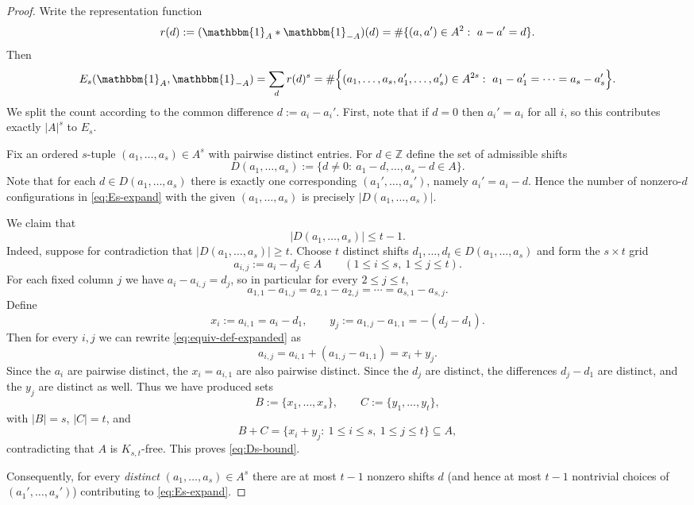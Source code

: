 \documentclass[A4paper,reqno,oneside,12pt]{amsart}
\theoremstyle{plain}
\theoremstyle{definition}
\newcommand{\e}{\mathbbm{1}}          %
\newcommand{\Z}{\mathbb{Z}}
\begin{document}
\begin{proof}
Write the representation function  
\[
r(d):=(\e_A*\e_{-A})(d)=\#\{(a,a')\in A^2:\ a-a'=d\}.
\]
Then
\begin{equation}\label{eq:Es-expand}
E_s(\e_A,\e_{-A})
=\sum_{d} r(d)^s
=\#\Bigl\{(a_1,\dots,a_s,a_1',\dots,a_s')\in A^{2s}:\ a_1-a_1'=\cdots=a_s-a_s'\Bigr\}.
\end{equation}
We split the count according to the common difference $d:=a_i-a_i'$. First, note that if $d=0$ then $a_i'=a_i$ for all $i$, so this contributes exactly $|A|^s$ to $E_s$.

Fix an ordered $s$-tuple $(a_1,\dots,a_s)\in A^s$ with pairwise distinct entries. For $d\in\Z$ define the set of admissible shifts
\[
D(a_1,\dots,a_s):=\{d\neq 0:\ a_1-d,\dots,a_s-d\in A\}.
\]
Note that for each $d\in D(a_1,\dots,a_s)$ there is exactly one corresponding
$(a_1',\dots,a_s')$, namely $a_i'=a_i-d$. Hence the number of nonzero-$d$ configurations in
\eqref{eq:Es-expand} with the given $(a_1,\dots,a_s)$ is precisely $|D(a_1,\dots,a_s)|$.

We claim that
\begin{equation}\label{eq:Ds-bound}
|D(a_1,\dots,a_s)|\le t-1.
\end{equation}
Indeed, suppose for contradiction that $|D(a_1,\dots,a_s)|\ge t$.
Choose $t$ distinct shifts $d_1,\dots,d_t\in D(a_1,\dots,a_s)$ and form the $s\times t$ grid
\[
a_{i,j}:=a_i-d_j\in A\qquad(1\le i\le s,\ 1\le j\le t).
\]
For each fixed column $j$ we have $a_i-a_{i,j}=d_j$, so in particular for every $2\le j\le t$,
\begin{equation}\label{eq:equiv-def-expanded}
a_{1,1}-a_{1,j}=a_{2,1}-a_{2,j}=\cdots=a_{s,1}-a_{s,j}.
\end{equation}
Define
\[
x_i:=a_{i,1}=a_i-d_1,\qquad
y_j:=a_{1,j}-a_{1,1}=-(d_j-d_1).
\]
Then for every $i,j$ we can rewrite \eqref{eq:equiv-def-expanded} as
\[
a_{i,j}
= a_{i,1} + (a_{1,j}-a_{1,1})
= x_i+y_j.
\]
Since the $a_i$ are pairwise distinct, the $x_i=a_{i,1}$ are also pairwise distinct.
Since the $d_j$ are distinct, the differences $d_j-d_1$ are distinct, and the $y_j$ are distinct as well.
Thus we have produced sets
\[
B:=\{x_1,\dots,x_s\},\qquad C:=\{y_1,\dots,y_t\},
\]
with $|B|=s$, $|C|=t$, and
\[
B+C=\{x_i+y_j:\ 1\le i\le s,\ 1\le j\le t\}\subseteq A,
\]
contradicting that $A$ is $K_{s,t}$-free. This proves \eqref{eq:Ds-bound}.

Consequently, for every \emph{distinct} $(a_1,\dots,a_s)\in A^s$ there are at most $t-1$ nonzero shifts $d$
(and hence at most $t-1$ nontrivial choices of $(a_1',\dots,a_s')$) contributing to \eqref{eq:Es-expand}.



\end{proof}
\end{document}
